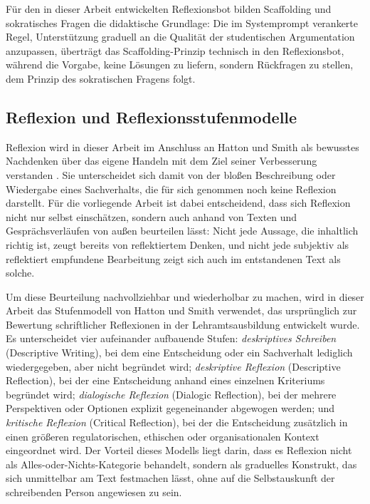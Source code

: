 Für den in dieser Arbeit entwickelten Reflexionsbot bilden Scaffolding und sokratisches Fragen die
didaktische Grundlage: Die im Systemprompt verankerte Regel, Unterstützung graduell an die
Qualität der studentischen Argumentation anzupassen, überträgt das Scaffolding-Prinzip technisch
in den Reflexionsbot, während die Vorgabe, keine Lösungen zu liefern, sondern Rückfragen zu
stellen, dem Prinzip des sokratischen Fragens folgt.

\subsection{Reflexion und Reflexionsstufenmodelle}
\label{sec:reflexionsstufenmodelle}
Reflexion wird in dieser Arbeit im Anschluss an Hatton und Smith als bewusstes Nachdenken über das
eigene Handeln mit dem Ziel seiner Verbesserung verstanden
\cite{hattonSmithReflectionTeacherEducation1995}. Sie unterscheidet sich damit von der bloßen
Beschreibung oder Wiedergabe eines Sachverhalts, die für sich genommen noch keine Reflexion
darstellt. Für die vorliegende Arbeit ist dabei entscheidend, dass sich Reflexion nicht
nur selbst einschätzen, sondern auch anhand von Texten und Gesprächsverläufen von außen beurteilen
lässt: Nicht jede Aussage, die inhaltlich richtig ist, zeugt bereits von reflektiertem Denken, und
nicht jede subjektiv als reflektiert empfundene Bearbeitung zeigt sich auch im entstandenen Text
als solche.

Um diese Beurteilung nachvollziehbar und wiederholbar zu machen, wird in dieser Arbeit das
Stufenmodell von Hatton und Smith \cite{hattonSmithReflectionTeacherEducation1995} verwendet, das
ursprünglich zur Bewertung schriftlicher Reflexionen in der Lehramtsausbildung entwickelt wurde.
Es unterscheidet vier aufeinander aufbauende Stufen: \emph{deskriptives Schreiben} (Descriptive
Writing), bei dem eine Entscheidung oder ein Sachverhalt lediglich wiedergegeben, aber nicht
begründet wird; \emph{deskriptive Reflexion} (Descriptive Reflection), bei der eine Entscheidung
anhand eines einzelnen Kriteriums begründet wird; \emph{dialogische Reflexion} (Dialogic
Reflection), bei der mehrere Perspektiven oder Optionen explizit gegeneinander abgewogen werden;
und \emph{kritische Reflexion} (Critical Reflection), bei der die Entscheidung zusätzlich
in einen größeren regulatorischen, ethischen oder organisationalen Kontext eingeordnet wird. Der
Vorteil dieses Modells liegt darin, dass es Reflexion nicht als Alles-oder-Nichts-Kategorie
behandelt, sondern als graduelles Konstrukt, das sich unmittelbar am Text festmachen lässt, ohne
auf die Selbstauskunft der schreibenden Person angewiesen zu sein.

